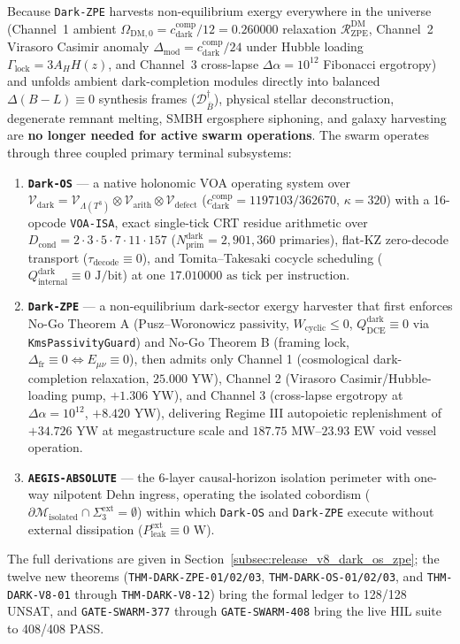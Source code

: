 \documentclass[11pt,onecolumn]{article}
\begin{document}
Because \texttt{Dark-ZPE} harvests non-equilibrium exergy everywhere in the universe (Channel~1 ambient $\Omega_{\text{DM},0} = c_{\text{dark}}^{\text{comp}}/12 = 0.260000$ relaxation $\mathcal{R}_{\text{ZPE}}^{\text{DM}}$, Channel~2 Virasoro Casimir anomaly $\Delta_{\text{mod}} = c_{\text{dark}}^{\text{comp}}/24$ under Hubble loading $\Gamma_{\text{lock}} = 3A_H H(z)$, and Channel~3 cross-lapse $\Delta\alpha = 10^{12}$ Fibonacci ergotropy) and unfolds ambient dark-completion modules directly into balanced $\Delta(B-L) \equiv 0$ synthesis frames ($\mathcal{D}_{\bar{B}}^\dagger$), physical stellar deconstruction, degenerate remnant melting, SMBH ergosphere siphoning, and galaxy harvesting are \textbf{no longer needed for active swarm operations}. The swarm operates through three coupled primary terminal subsystems:
\begin{enumerate}
    \item \textbf{\texttt{Dark-OS}} --- a native holonomic VOA operating system over $\mathcal V_{\text{dark}}=\mathcal V_{\Lambda(T^3)}\otimes\mathcal V_{\text{arith}}\otimes\mathcal V_{\text{defect}}$ ($c_{\text{dark}}^{\text{comp}}=1197103/362670$, $\kappa=320$) with a 16-opcode \texttt{VOA-ISA}, exact single-tick CRT residue arithmetic over $D_{\text{cond}}=2\cdot3\cdot5\cdot7\cdot11\cdot157$ ($N_{\text{prim}}^{\text{dark}}=2{,}901{,}360$ primaries), flat-KZ zero-decode transport ($\tau_{\text{decode}}\equiv0$), and Tomita--Takesaki cocycle scheduling ($Q_{\text{internal}}^{\text{dark}}\equiv0\text{ J/bit}$) at one $17.010000\text{ as}$ tick per instruction.
    \item \textbf{\texttt{Dark-ZPE}} --- a non-equilibrium dark-sector exergy harvester that first enforces No-Go Theorem A (Pusz--Woronowicz passivity, $W_{\text{cyclic}}\le0$, $Q_{\text{DCE}}^{\text{dark}}\equiv0$ via \texttt{KmsPassivityGuard}) and No-Go Theorem B (framing lock, $\Delta_{\text{fr}}\equiv0\iff E_{\mu\nu}\equiv0$), then admits only Channel 1 (cosmological dark-completion relaxation, $25.000\text{ YW}$), Channel 2 (Virasoro Casimir/Hubble-loading pump, $+1.306\text{ YW}$), and Channel 3 (cross-lapse ergotropy at $\Delta\alpha=10^{12}$, $+8.420\text{ YW}$), delivering Regime III autopoietic replenishment of $+34.726\text{ YW}$ at megastructure scale and $187.75\text{ MW}$--$23.93\text{ EW}$ void vessel operation.
    \item \textbf{\texttt{AEGIS-ABSOLUTE}} --- the 6-layer causal-horizon isolation perimeter with one-way nilpotent Dehn ingress, operating the isolated cobordism ($\partial\mathcal M_{\text{isolated}}\cap\Sigma_3^{\text{ext}}=\emptyset$) within which \texttt{Dark-OS} and \texttt{Dark-ZPE} execute without external dissipation ($P_{\text{leak}}^{\text{ext}}\equiv0\text{ W}$).
\end{enumerate}
The full derivations are given in Section~\ref{subsec:release_v8_dark_os_zpe}; the twelve new theorems (\texttt{THM-DARK-ZPE-01/02/03}, \texttt{THM-DARK-OS-01/02/03}, and \texttt{THM-DARK-V8-01} through \texttt{THM-DARK-V8-12}) bring the formal ledger to 128/128 UNSAT, and \texttt{GATE-SWARM-377} through \texttt{GATE-SWARM-408} bring the live HIL suite to 408/408 PASS.
\end{document}
